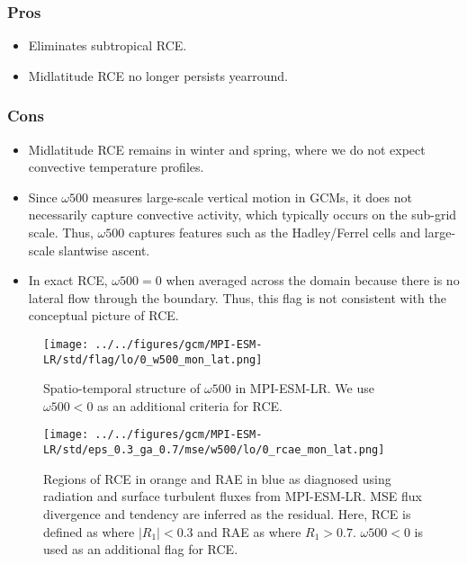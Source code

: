 \documentclass[11pt]{article}
\begin{document}
\subsubsection*{Pros}
\label{sec:org61de612}
\begin{itemize}
\item Eliminates subtropical RCE.
\item Midlatitude RCE no longer persists yearround.
\end{itemize}
\subsubsection*{Cons}
\label{sec:org4e21439}
\begin{itemize}
\item Midlatitude RCE remains in winter and spring, where we do not expect convective temperature profiles.
\item Since \(\omega500\) measures large-scale vertical motion in GCMs, it does not necessarily capture convective activity, which typically occurs on the sub-grid scale. Thus, \(\omega500\) captures features such as the Hadley/Ferrel cells and large-scale slantwise ascent.
\item In exact RCE, \(\omega500=0\) when averaged across the domain because there is no lateral flow through the boundary. Thus, this flag is not consistent with the conceptual picture of RCE.
\end{itemize}

\clearpage

\begin{figure}[!h]
\centering
\texttt{[image: ../../figures/gcm/MPI-ESM-LR/std/flag/lo/0\_w500\_mon\_lat.png]}
\caption{\label{fig:orga08856b}Spatio-temporal structure of \(\omega500\) in MPI-ESM-LR. We use \(\omega500<0\) as an additional criteria for RCE.}
\end{figure}

\begin{figure}[!h]
\centering
\texttt{[image: ../../figures/gcm/MPI-ESM-LR/std/eps\_0.3\_ga\_0.7/mse/w500/lo/0\_rcae\_mon\_lat.png]}
\caption{\label{fig:org17106c3}Regions of RCE in orange and RAE in blue as diagnosed using radiation and surface turbulent fluxes from MPI-ESM-LR. MSE flux divergence and tendency are inferred as the residual. Here, RCE is defined as where \(|R_1| < 0.3\) and RAE as where \(R_1 > 0.7\). \(\omega500<0\) is used as an additional flag for RCE.}
\end{figure}
\end{document}
